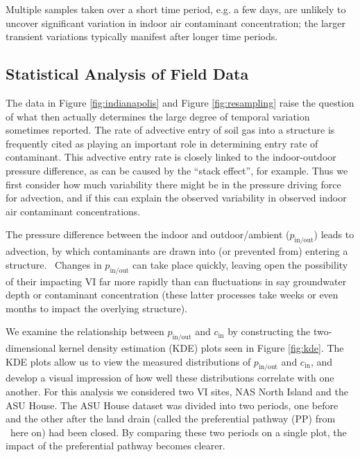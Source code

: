 \documentclass[preprint,12pt]{elsarticle}
\begin{document}
Multiple samples taken over a short time period, e.g. a few days, are unlikely to uncover significant variation in indoor air contaminant concentration; the larger transient variations typically manifest after longer time periods. \par

\subsection{Statistical Analysis of Field Data}\label{s:results_pressure_concentration}

The data in Figure \ref{fig:indianapolis} and Figure \ref{fig:resampling} raise the question of what then actually determines the large degree of temporal variation sometimes reported.
The rate of advective entry of soil gas into a structure is frequently cited as playing an important role in determining entry rate of contaminant.
This advective entry rate is closely linked to the indoor-outdoor pressure difference, as can be caused by the “stack effect”, for example.
Thus we first consider how much variability there might be in the pressure driving force for advection, and if this can explain the observed variability in observed indoor air contaminant concentrations.\par

The pressure difference between the indoor and outdoor/ambient ($p_\mathrm{in/out}$) leads to advection, by which contaminants are drawn into (or prevented from) entering a structure. 
Changes in $p_\mathrm{in/out}$ can take place quickly, leaving open the possibility of their impacting VI far more rapidly than can fluctuations in say groundwater depth or contaminant concentration (these latter processes take weeks or even months to impact the overlying structure).\par

We examine the relationship between $p_\mathrm{in/out}$ and $c_\mathrm{in}$ by constructing the two-dimensional kernel density estimation (KDE) plots seen in Figure \ref{fig:kde}.
The KDE plots allow us to view the measured distributions of $p_\mathrm{in/out}$ and $c_\mathrm{in}$, and develop a visual impression of how well these distributions correlate with one another.
For this analysis we considered two VI sites, NAS North Island and the ASU House.
The ASU House dataset was divided into two periods, one before and the other after the land drain (called the preferential pathway (PP) from  here on) had been closed.
By comparing these two periods on a single plot, the impact of the preferential pathway becomes clearer.\par
\end{document}
